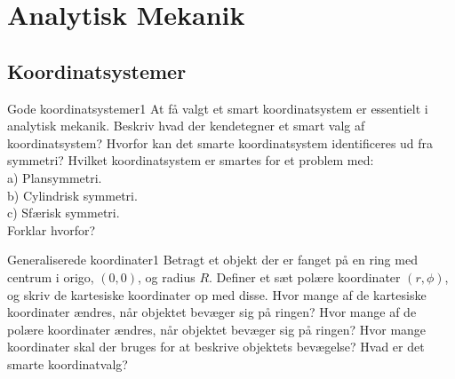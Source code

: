\chapter{Analytisk Mekanik}
%
%
\section*{Koordinatsystemer}
\begin{opgave}{Gode koordinatsystemer}{1}
At få valgt et smart koordinatsystem er essentielt i analytisk mekanik.
\opg Beskriv hvad der kendetegner et smart valg af koordinatsystem?
\opg Hvorfor kan det smarte koordinatsystem identificeres ud fra symmetri?
\opg Hvilket koordinatsystem er smartes for et problem med: \\
a) Plansymmetri. \\
b) Cylindrisk symmetri. \\
c) Sfærisk symmetri. \\
Forklar hvorfor?
\end{opgave}
%
%
\begin{opgave}{Generaliserede koordinater}{1}
Betragt et objekt der er fanget på en ring med centrum i origo, $(0,0)$, og radius $R$.
\opg Definer et sæt polære koordinater $(r,\phi)$, og skriv de kartesiske koordinater op med disse.
\opg Hvor mange af de kartesiske koordinater ændres, når objektet bevæger sig på ringen?
\opg Hvor mange af de polære koordinater ændres, når objektet bevæger sig på ringen?
\opg Hvor mange koordinater skal der bruges for at beskrive objektets bevægelse?
\opg Hvad er det smarte koordinatvalg?
\end{opgave}
%
%

